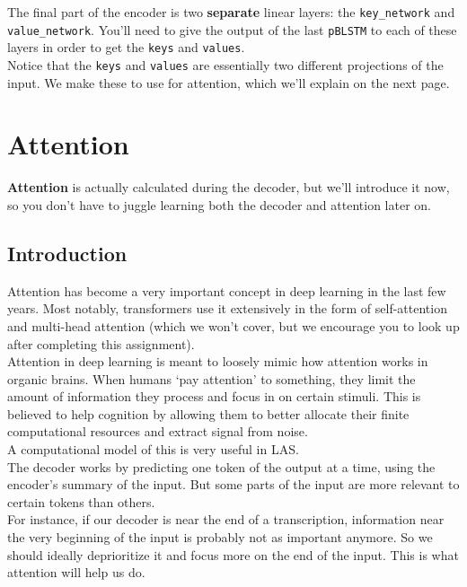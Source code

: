 \documentclass{article}
\newcommand{\ttt}[1]{\texttt{#1}}
\begin{document}
The final part of the encoder is two \textbf{separate} linear layers: the \ttt{key\_network} and \ttt{value\_network}. You'll need to give the output of the last \ttt{pBLSTM} to each of these layers in order to get the \ttt{keys} and \ttt{values}. \\

Notice that the \ttt{keys} and \ttt{values} are essentially two different projections of the input. We make these to use for attention, which we'll explain on the next page.

\newpage


\section{Attention}

\textbf{Attention} is actually calculated during the decoder, but we'll introduce it now, so you don't have to juggle learning both the decoder and attention later on.

\subsection{Introduction}

Attention has become a very important concept in deep learning in the last few years. Most notably, transformers use it extensively in the form of self-attention and multi-head attention (which we won't cover, but we encourage you to look up after completing this assignment). \\

Attention in deep learning is meant to loosely mimic how attention works in organic brains. When humans `pay attention' to something, they limit the amount of information they process and focus in on certain stimuli. This is believed to help cognition by allowing them to better allocate their finite computational resources and extract signal from noise. \\

A computational model of this is very useful in LAS. \\

The decoder works by predicting one token of the output at a time, using the encoder's summary of the input. But some parts of the input are more relevant to certain tokens than others. \\

For instance, if our decoder is near the end of a transcription, information near the very beginning of the input is probably not as important anymore. So we should ideally deprioritize it and focus more on the end of the input. This is what attention will help us do.
\end{document}
